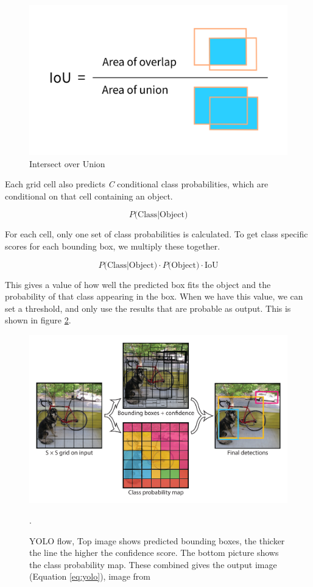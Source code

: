 \begin{figure}[h!]
\centering
\includegraphics[width=0.8 \textwidth]{fig/iou2.png}
\caption{Intersect over Union}
\label{fig:IoU}
\end{figure}

\noindent
Each grid cell also predicts \textit{C} conditional class probabilities, which are conditional on that cell containing an object. 

\begin{equation}
  P\text{(Class}|\text{Object)}
\end{equation}

\noindent
For each cell, only one set of class probabilities is calculated. To get class specific scores for each bounding box, we multiply these together. 

\begin{equation}
    P\text{(Class}|\text{Object)} \cdot P\text{(Object)} \cdot \text{IoU}
    \label{eq:yolo}
\end{equation}

\noindent
This gives a value of how well the predicted box fits the object and the probability of that class appearing in the box. When we have this value, we can set a threshold, and only use the results that are probable as output. This is shown in figure \ref{fig:yolo_flow}.  

\begin{figure}[h!]
\centering
\includegraphics[width=0.8 \textwidth]{images/yolo_flow.png}
\caption{YOLO flow, Top image shows predicted bounding boxes, the thicker the line the higher the confidence score. The bottom picture shows the class probability map. These combined gives the output image (Equation \ref{eq:yolo}), image from \citep{YOLOv1}}.
\label{fig:yolo_flow}
\end{figure}

